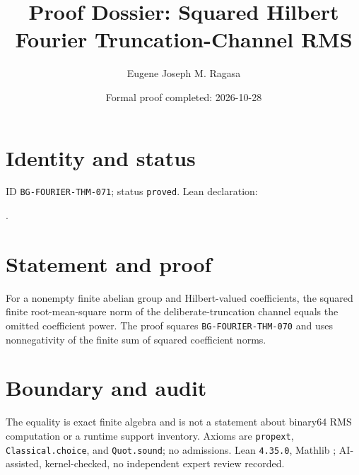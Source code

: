 \documentclass[11pt]{article}
\title{Proof Dossier: Squared Hilbert Fourier Truncation-Channel RMS}\author{Eugene Joseph M. Ragasa}\date{Formal proof completed: 2026-10-28}
\begin{document}
\raggedright\maketitle
\section{Identity and status}
ID \texttt{BG-FOURIER-THM-071}; status \texttt{proved}. Lean declaration:
\par{}.
\section{Statement and proof}
For a nonempty finite abelian group and Hilbert-valued coefficients, the squared finite root-mean-square norm of the deliberate-truncation channel equals the omitted coefficient power. The proof squares \texttt{BG-FOURIER-THM-070} and uses nonnegativity of the finite sum of squared coefficient norms.
\section{Boundary and audit}
The equality is exact finite algebra and is not a statement about binary64 RMS computation or a runtime support inventory. Axioms are \texttt{propext}, \texttt{Classical.choice}, and \texttt{Quot.sound}; no admissions. Lean \texttt{4.35.0}, Mathlib {\scriptsize{}}; AI-assisted, kernel-checked, no independent expert review recorded.
\end{document}

